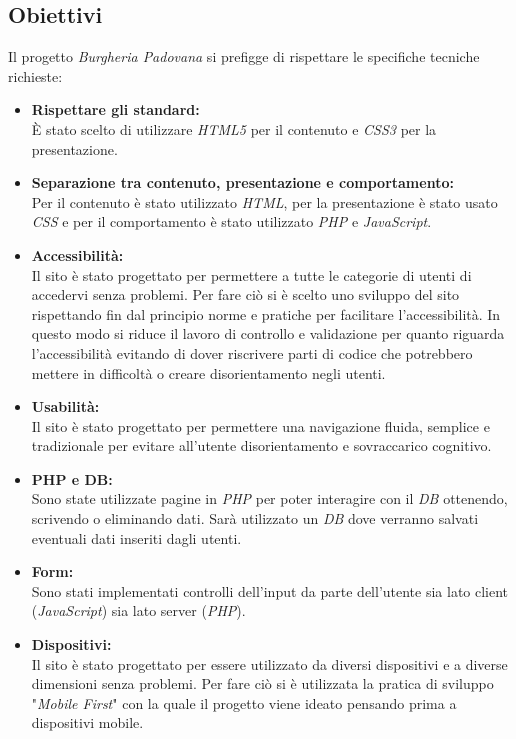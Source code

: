 \subsection{Obiettivi}
Il progetto \emph{Burgheria Padovana} si prefigge di rispettare le specifiche tecniche richieste:
\begin{itemize}
	\item \textbf{Rispettare gli standard:}\\ 
	È stato scelto di utilizzare \emph{HTML5} per il contenuto e \emph{CSS3} per la presentazione.
	\item \textbf{Separazione tra contenuto, presentazione e comportamento:}\\ 
	Per il contenuto è stato utilizzato \emph{HTML}, per la presentazione è stato usato \emph{CSS} e per il comportamento è stato utilizzato \emph{PHP} e \emph{JavaScript}.
	\item \textbf{Accessibilità:}\\ 
	Il sito è stato progettato per permettere a tutte le categorie di utenti di accedervi senza problemi.
	Per fare ciò si è scelto uno sviluppo del sito rispettando fin dal principio norme e pratiche per facilitare l'accessibilità.
	In questo modo si riduce il lavoro di controllo e validazione per quanto riguarda l'accessibilità evitando di dover riscrivere parti di codice che potrebbero mettere in difficoltà o creare disorientamento negli utenti.
	\item \textbf{Usabilità:}\\
	Il sito è stato progettato per permettere una navigazione fluida, semplice e tradizionale per evitare all'utente disorientamento e sovraccarico cognitivo.
	\item \textbf{PHP e DB:}\\
	Sono state utilizzate pagine in \emph{PHP} per poter interagire con il \emph{DB} ottenendo, scrivendo o eliminando dati. Sarà utilizzato un \emph{DB} dove verranno salvati eventuali dati inseriti dagli utenti.
	\item \textbf{Form:}\\
	Sono stati implementati controlli dell'input da parte dell'utente sia lato client (\emph{JavaScript}) sia lato server (\emph{PHP}).
	\item \textbf{Dispositivi:}\\
	Il sito è stato progettato per essere utilizzato da diversi dispositivi e a diverse dimensioni senza problemi. Per fare ciò si è utilizzata la pratica di sviluppo "\emph{Mobile First}" con la quale il progetto viene ideato pensando prima a dispositivi mobile.
\end{itemize}
